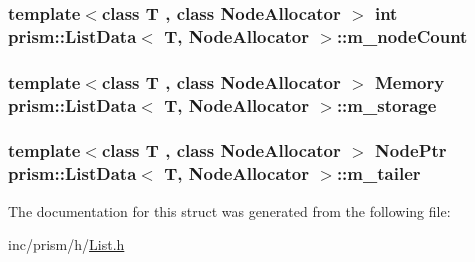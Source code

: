 \subsubsection[{\texorpdfstring{m\+\_\+node\+Count}{m_nodeCount}}]{\setlength{\rightskip}{0pt plus 5cm}template$<$class T , class Node\+Allocator $>$ int {\bf prism\+::\+List\+Data}$<$ T, Node\+Allocator $>$\+::m\+\_\+node\+Count}\hypertarget{structprism_1_1_list_data_a43e4bc056d6706e12940fcb8943bc230}{}\label{structprism_1_1_list_data_a43e4bc056d6706e12940fcb8943bc230}
\subsubsection[{\texorpdfstring{m\+\_\+storage}{m_storage}}]{\setlength{\rightskip}{0pt plus 5cm}template$<$class T , class Node\+Allocator $>$ {\bf Memory} {\bf prism\+::\+List\+Data}$<$ T, Node\+Allocator $>$\+::m\+\_\+storage}\hypertarget{structprism_1_1_list_data_a0a9588fe5613d57dde51fcc5a6fd98fb}{}\label{structprism_1_1_list_data_a0a9588fe5613d57dde51fcc5a6fd98fb}
\subsubsection[{\texorpdfstring{m\+\_\+tailer}{m_tailer}}]{\setlength{\rightskip}{0pt plus 5cm}template$<$class T , class Node\+Allocator $>$ {\bf Node\+Ptr} {\bf prism\+::\+List\+Data}$<$ T, Node\+Allocator $>$\+::m\+\_\+tailer}\hypertarget{structprism_1_1_list_data_a9ec1550df72632fa63473f57c7b5bb3c}{}\label{structprism_1_1_list_data_a9ec1550df72632fa63473f57c7b5bb3c}


The documentation for this struct was generated from the following file\+:\begin{DoxyCompactItemize}
\item 
inc/prism/h/\hyperlink{_list_8h}{List.\+h}\end{DoxyCompactItemize}
